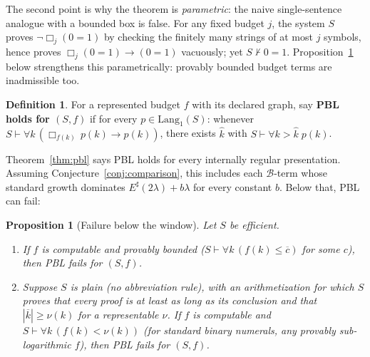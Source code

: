 \documentclass[11pt]{amsart}
\theoremstyle{plain}
\newtheorem{proposition}[theorem]{Proposition}
\theoremstyle{definition}
\newtheorem{definition}[theorem]{Definition}
\newcommand{\Lang}{\mathrm{Lang}}
\newcommand{\num}[1]{\overline{#1}}
\newcommand{\Bud}{\mathcal{B}}
\begin{document}
The second point is why the theorem is \emph{parametric}: the naive single-sentence analogue with a bounded box is false. For any fixed budget $j$, the system $S$ proves $\neg\Box_j(0=1)$ by checking the finitely many strings of at most $j$ symbols, hence proves $\Box_j(0=1) \to (0=1)$ vacuously; yet $S \nvdash 0=1$. Proposition~\ref{prop:failure} below strengthens this parametrically: provably bounded budget terms are inadmissible too.

\begin{definition}
\label{def:pblproperty}
For a represented budget $f$ with its declared graph, say \textbf{PBL holds for $(S,f)$} if for every $p \in \Lang_1(S)$: whenever $S \vdash \forall k\,(\Box_{f(k)}\,p(k) \to p(k))$, there exists $\hat{k}$ with $S \vdash \forall k > \hat{k}\;p(k)$.
\end{definition}

Theorem~\ref{thm:pbl} says PBL holds for every internally regular presentation. Assuming Conjecture~\ref{conj:comparison}, this includes each $\Bud$-term whose standard growth dominates $E^\sharp(2\lambda)+b\lambda$ for every constant $b$. Below that, PBL can fail:

\begin{proposition}[Failure below the window]
\label{prop:failure}
Let $S$ be efficient.
\begin{enumerate}
\item If $f$ is computable and provably bounded ($S \vdash \forall k\,(f(k) \le \num{c})$ for some $c$), then PBL fails for $(S,f)$.
\item Suppose $S$ is plain (no abbreviation rule), with an arithmetization for which $S$ proves that every proof is at least as long as its conclusion and that $|\num{k}| \ge \nu(k)$ for a representable $\nu$. If $f$ is computable and $S \vdash \forall k\,(f(k) < \nu(k))$ (for standard binary numerals, any provably sub-logarithmic $f$), then PBL fails for $(S,f)$.
\end{enumerate}
\end{proposition}
\end{document}
